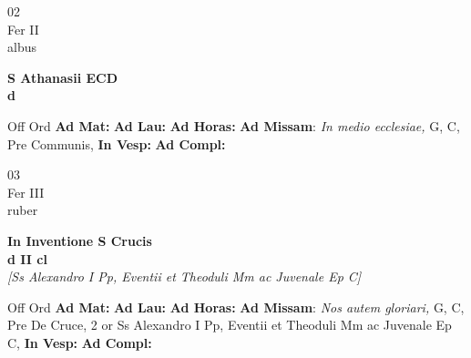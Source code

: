 \documentclass[10pt, openany]{book}
\begin{document}
        \begin{center}
            \begin{minipage}{3.5in}
                \vspace{2em}
                \begin{minipage}{0.5in}
                    {\Huge 02} \\
                    {\normalsize Fer II} \\
                    {\normalsize albus}
                \end{minipage}
                \begin{minipage}{3.0in}
                    \textbf{ \large S Athanasii ECD \\
                    \textnormal{\normalsize d}} \\ 
                \end{minipage}
                \begin{justify}Off Ord
                    \textbf{Ad Mat: }
                    \textbf{Ad Lau: }
                    \textbf{Ad Horas: }\textbf{Ad Missam}: \textit{In medio ecclesiae,} G, C, Pre Communis,  
                    \textbf{In Vesp: }
                    \textbf{Ad Compl: }
                \end{justify}
            \end{minipage}
        \end{center}
    
        \begin{center}
            \begin{minipage}{3.5in}
                \vspace{2em}
                \begin{minipage}{0.5in}
                    {\Huge 03} \\
                    {\normalsize Fer III} \\
                    {\normalsize ruber}
                \end{minipage}
                \begin{minipage}{3.0in}
                    \textbf{ \large In Inventione S Crucis \\
                    \textnormal{\normalsize d II cl}} \\ \textit{[Ss Alexandro I Pp, Eventii et Theoduli Mm ac Juvenale Ep C]} \\ 
                \end{minipage}
                \begin{justify}Off Ord
                    \textbf{Ad Mat: }
                    \textbf{Ad Lau: }
                    \textbf{Ad Horas: }\textbf{Ad Missam}: \textit{Nos autem gloriari,} G, C, Pre De Cruce, 2 or Ss Alexandro I Pp, Eventii et Theoduli Mm ac Juvenale Ep C,  
                    \textbf{In Vesp: }
                    \textbf{Ad Compl: }
                \end{justify}
            \end{minipage}
        \end{center}
    
\end{document}
